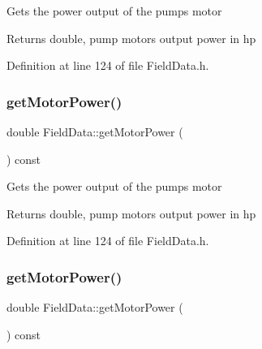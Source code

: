 Gets the power output of the pump\textquotesingle{}s motor

\begin{DoxyReturn}{Returns}
double, pump motor\textquotesingle{}s output power in hp 
\end{DoxyReturn}


Definition at line 124 of file Field\+Data.\+h.

\mbox{\label{class_field_data_a3e8e1bf84bbd00b9b52b803147968c81}} 
\subsubsection{\texorpdfstring{get\+Motor\+Power()}{getMotorPower()}\hspace{0.1cm}{\footnotesize\ttfamily [2/3]}}
{\footnotesize\ttfamily double Field\+Data\+::get\+Motor\+Power (\begin{DoxyParamCaption}{ }\end{DoxyParamCaption}) const\hspace{0.3cm}{\ttfamily [inline]}}

Gets the power output of the pump\textquotesingle{}s motor

\begin{DoxyReturn}{Returns}
double, pump motor\textquotesingle{}s output power in hp 
\end{DoxyReturn}


Definition at line 124 of file Field\+Data.\+h.

\mbox{\label{class_field_data_a3e8e1bf84bbd00b9b52b803147968c81}} 
\subsubsection{\texorpdfstring{get\+Motor\+Power()}{getMotorPower()}\hspace{0.1cm}{\footnotesize\ttfamily [3/3]}}
{\footnotesize\ttfamily double Field\+Data\+::get\+Motor\+Power (\begin{DoxyParamCaption}{ }\end{DoxyParamCaption}) const\hspace{0.3cm}{\ttfamily [inline]}}

